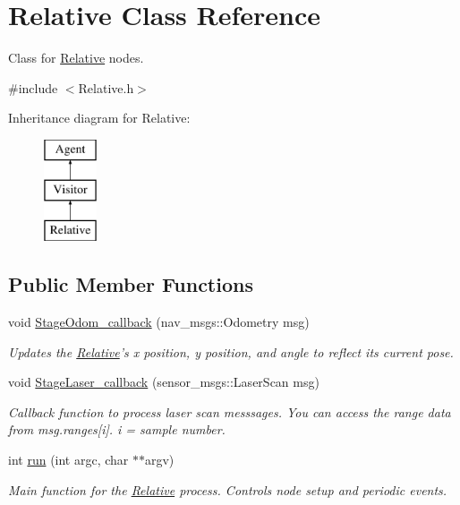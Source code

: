 \hypertarget{classRelative}{\section{Relative Class Reference}
\label{classRelative}
}


Class for \hyperlink{classRelative}{Relative} nodes.  




{\ttfamily \#include $<$Relative.\-h$>$}

Inheritance diagram for Relative\-:\begin{figure}[H]
\begin{center}
\leavevmode
\includegraphics[height=3.000000cm]{classRelative}
\end{center}
\end{figure}
\subsection*{Public Member Functions}
\begin{DoxyCompactItemize}
\item 
void \hyperlink{classRelative_a13fc6c65f7338cfa29c9f31958134c56}{Stage\-Odom\-\_\-callback} (nav\-\_\-msgs\-::\-Odometry msg)
\begin{DoxyCompactList}\small\item\em Updates the \hyperlink{classRelative}{Relative}'s x position, y position, and angle to reflect its current pose. \end{DoxyCompactList}\item 
void \hyperlink{classRelative_a556d177e5d1562ab9af5018ef382c836}{Stage\-Laser\-\_\-callback} (sensor\-\_\-msgs\-::\-Laser\-Scan msg)
\begin{DoxyCompactList}\small\item\em Callback function to process laser scan messsages. You can access the range data from msg.\-ranges\mbox{[}i\mbox{]}. i = sample number. \end{DoxyCompactList}\item 
\hypertarget{classRelative_a966fc1a728e7b4ab9bde0cb636b5d7a9}{int \hyperlink{classRelative_a966fc1a728e7b4ab9bde0cb636b5d7a9}{run} (int argc, char $\ast$$\ast$argv)}\label{classRelative_a966fc1a728e7b4ab9bde0cb636b5d7a9}

\begin{DoxyCompactList}\small\item\em Main function for the \hyperlink{classRelative}{Relative} process. Controls node setup and periodic events. \end{DoxyCompactList}\end{DoxyCompactItemize}

